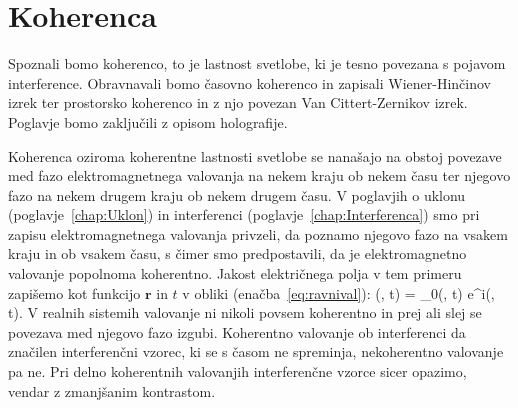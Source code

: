 
\chapter{Koherenca}
\label{chap:Koherenca}
Spoznali bomo koherenco, to je lastnost svetlobe, ki je tesno povezana
s pojavom interference. Obravnavali bomo časovno koherenco in zapisali 
Wiener-Hinčinov izrek ter prostorsko koherenco in z njo povezan 
Van Cittert-Zernikov izrek. Poglavje bomo zaključili z opisom holografije.

Koherenca oziroma koherentne lastnosti svetlobe se nanašajo na obstoj povezave
med fazo elektromagnetnega valovanja na nekem kraju ob nekem času ter njegovo 
fazo na nekem drugem kraju ob nekem drugem času. V poglavjih o 
uklonu (poglavje~\ref{chap:Uklon}) in interferenci (poglavje~\ref{chap:Interferenca})
smo pri zapisu elektromagnetnega valovanja privzeli, da poznamo njegovo fazo 
na vsakem kraju in ob vsakem času, s čimer smo predpostavili, 
da je elektromagnetno valovanje popolnoma koherentno. Jakost
električnega polja v tem primeru zapišemo kot funkcijo $\mathbf{r}$ in $t$ 
v obliki (enačba~\ref{eq:ravnival}):
\beq
{} (, t) = _0(, t) 
e^{i\phi(, t)}.
\label{eq:08_01}
\eeq
V realnih sistemih valovanje
ni nikoli povsem koherentno in prej ali slej se povezava med njegovo 
fazo izgubi. Koherentno valovanje ob interferenci da značilen interferenčni 
vzorec, ki se s časom ne spreminja, nekoherentno valovanje pa ne. Pri  
delno koherentnih valovanjih interferenčne vzorce sicer opazimo, vendar z zmanjšanim
kontrastom. 

